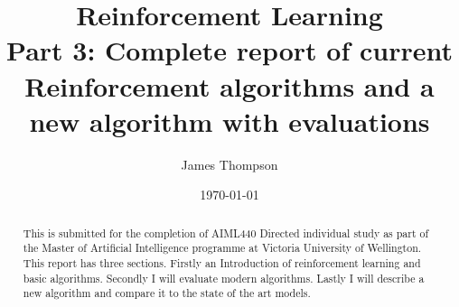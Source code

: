 \documentclass[11pt
              , a4paper
              , twoside
              , openright
              ]{report}
\title{Reinforcement Learning \\
\large Part 3: Complete report of current Reinforcement algorithms and a new algorithm with evaluations}
\author{James Thompson}
\date{\today}
\begin{document}
\frontmatter



\begin{abstract}

This is submitted for the completion of AIML440 Directed individual study as part of the Master of Artificial Intelligence programme at Victoria University of Wellington. This report has three sections. Firstly an Introduction of reinforcement learning and basic algorithms. Secondly I will evaluate modern algorithms. Lastly I will describe a new algorithm and compare it to the state of the art models.
\end{abstract}


\maketitle

% 

\tableofcontents



\mainmatter
















\backmatter



%



\appendix


\end{document}
